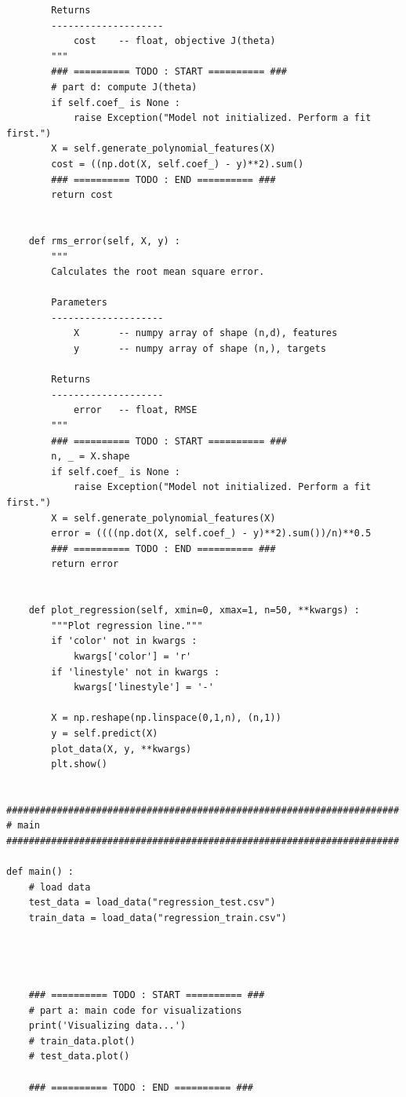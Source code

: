 \documentclass[11pt]{article}
\begin{document}
\begin{verbatim}
        Returns
        --------------------
            cost    -- float, objective J(theta)
        """
        ### ========== TODO : START ========== ###
        # part d: compute J(theta)
        if self.coef_ is None :
            raise Exception("Model not initialized. Perform a fit first.")
        X = self.generate_polynomial_features(X)
        cost = ((np.dot(X, self.coef_) - y)**2).sum()
        ### ========== TODO : END ========== ###
        return cost
    
    
    def rms_error(self, X, y) :
        """
        Calculates the root mean square error.
        
        Parameters
        --------------------
            X       -- numpy array of shape (n,d), features
            y       -- numpy array of shape (n,), targets
        
        Returns
        --------------------
            error   -- float, RMSE
        """
        ### ========== TODO : START ========== ###
        n, _ = X.shape
        if self.coef_ is None :
            raise Exception("Model not initialized. Perform a fit first.")
        X = self.generate_polynomial_features(X)
        error = ((((np.dot(X, self.coef_) - y)**2).sum())/n)**0.5
        ### ========== TODO : END ========== ###
        return error
    
    
    def plot_regression(self, xmin=0, xmax=1, n=50, **kwargs) :
        """Plot regression line."""
        if 'color' not in kwargs :
            kwargs['color'] = 'r'
        if 'linestyle' not in kwargs :
            kwargs['linestyle'] = '-'
        
        X = np.reshape(np.linspace(0,1,n), (n,1))
        y = self.predict(X)
        plot_data(X, y, **kwargs)
        plt.show()


######################################################################
# main
######################################################################

def main() :
    # load data
    test_data = load_data("regression_test.csv")
    train_data = load_data("regression_train.csv")
    
    
    
    
    ### ========== TODO : START ========== ###
    # part a: main code for visualizations
    print('Visualizing data...')
    # train_data.plot()
    # test_data.plot()
    
    ### ========== TODO : END ========== ###
    
    
    

\end{verbatim}
\end{document}
